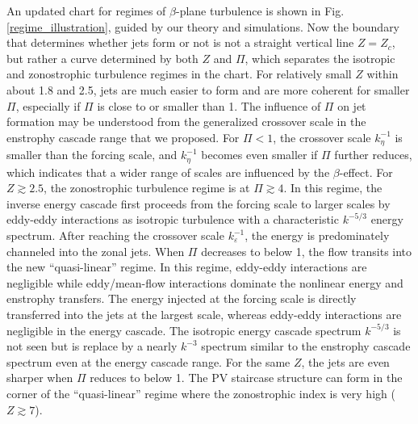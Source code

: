 \documentclass{ametsoc}
\begin{document}
An updated chart for regimes of $\beta$-plane turbulence is shown
in Fig. \ref{regime_illustration}, guided by our theory and simulations.
Now the boundary that determines whether jets form or not is not a
straight vertical line $Z=Z_{c}$, but rather a curve determined by
both $Z$ and $\Pi$, which separates the isotropic and zonostrophic turbulence
regimes in the chart. For relatively small $Z$ within about 1.8 and
2.5, jets are much easier to form and are more coherent for smaller
$\Pi$, especially if $\Pi$ is close to or smaller than 1. The influence
of $\Pi$ on jet formation may be understood from the generalized crossover scale
in the enstrophy cascade range that we proposed. For $\Pi<1$, the
crossover scale $k_{\eta}^{-1}$ is smaller than the forcing scale,
and $k_{\eta}^{-1}$ becomes even smaller if $\Pi$ further reduces,
which indicates that a wider range of scales are influenced by the $\beta$-effect.
For $Z\apprge2.5$, the zonostrophic turbulence regime is at $\Pi\apprge4$.
In this regime, the inverse energy cascade first proceeds from the
forcing scale to larger scales by eddy-eddy interactions as isotropic
turbulence with a characteristic $k^{-5/3}$ energy spectrum. After
reaching the crossover scale $k_{\varepsilon}^{-1}$, the energy is predominately
channeled into the zonal jets. When $\Pi$ decreases to below 1, the flow transits into
the new ``quasi-linear'' regime. In this regime, eddy-eddy interactions
are negligible while eddy/mean-flow interactions dominate the nonlinear
energy and enstrophy transfers. The energy injected at the forcing
scale is directly transferred into the jets at the largest scale, whereas
eddy-eddy interactions are negligible in the energy cascade. The isotropic
energy cascade spectrum $k^{-5/3}$ is not seen but is replace by
a nearly $k^{-3}$ spectrum similar to the enstrophy cascade spectrum
even at the energy cascade range. For the same $Z$, the jets are 
even sharper when $\Pi$ reduces to below 1. The PV staircase 
structure can form in the corner of the ``quasi-linear'' regime 
where the zonostrophic index is very high ($Z\apprge7$).
\end{document}
